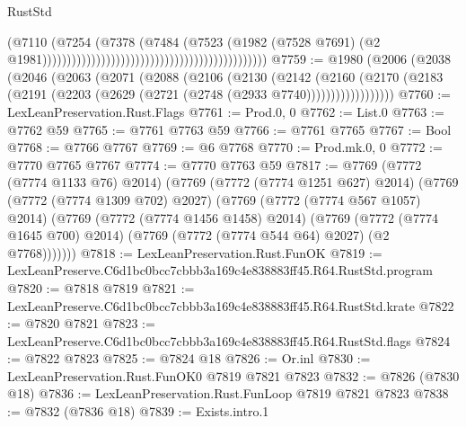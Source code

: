 \begin{lexlean}{RustStd}
\begin{coremodule}
                                                                                  (@7110
                                                                                    (@7254
                                                                                      (@7378
                                                                                        (@7484
                                                                                          (@7523
                                                                                            (@1982
                                                                                              (@7528
                                                                                                @7691)
                                                                                              (@2
                                                                                                @1981))))))))))))))))))))))))))))))))))))))))))))))
@7759 := @1980
    (@2006
      (@2038
        (@2046
          (@2063
            (@2071
              (@2088
                (@2106
                  (@2130
                    (@2142
                      (@2160
                        (@2170
                          (@2183 (@2191 (@2203 (@2629 (@2721 (@2748 (@2933 @7740))))))))))))))))))
@7760 := LexLeanPreservation.Rust.Flags
@7761 := Prod.{0, 0}
@7762 := List.{0}
@7763 := @7762 @59
@7765 := @7761 @7763 @59
@7766 := @7761 @7765
@7767 := Bool
@7768 := @7766 @7767
@7769 := @6 @7768
@7770 := Prod.mk.{0, 0}
@7772 := @7770 @7765 @7767
@7774 := @7770 @7763 @59
@7817 := @7769
    (@7772 (@7774 @1133 @76) @2014)
    (@7769
      (@7772 (@7774 @1251 @627) @2014)
      (@7769
        (@7772 (@7774 @1309 @702) @2027)
        (@7769
          (@7772 (@7774 @567 @1057) @2014)
          (@7769
            (@7772 (@7774 @1456 @1458) @2014)
            (@7769
              (@7772 (@7774 @1645 @700) @2014)
              (@7769 (@7772 (@7774 @544 @64) @2027) (@2 @7768)))))))
@7818 := LexLeanPreservation.Rust.FunOK
@7819 := LexLeanPreserve.C6d1bc0bcc7cbbb3a169c4e838883ff45.R64.RustStd.program
@7820 := @7818 @7819
@7821 := LexLeanPreserve.C6d1bc0bcc7cbbb3a169c4e838883ff45.R64.RustStd.krate
@7822 := @7820 @7821
@7823 := LexLeanPreserve.C6d1bc0bcc7cbbb3a169c4e838883ff45.R64.RustStd.flags
@7824 := @7822 @7823
@7825 := @7824 @18
@7826 := Or.inl
@7830 := LexLeanPreservation.Rust.FunOK0 @7819 @7821 @7823
@7832 := @7826 (@7830 @18)
@7836 := LexLeanPreservation.Rust.FunLoop @7819 @7821 @7823
@7838 := @7832 (@7836 @18)
@7839 := Exists.intro.{1}

\end{coremodule}
\end{lexlean}
